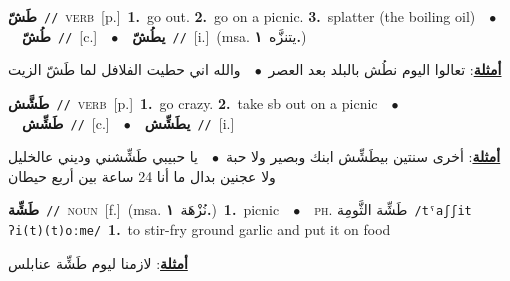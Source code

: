 \documentclass[10pt,a4paper,twoside]{article} %
\begin{document}
\begin{multicols}{2}
{\setlength\topsep{0pt}\textbf{\foreignlanguage{arabic}{طَشّ}}\ {\color{gray}\texttt{//}\color{black}}\ \textsc{verb}\ [p.]\ \textbf{1.}~go out.  \textbf{2.}~go on a picnic.  \textbf{3.}~splatter (the boiling oil)\ \ $\bullet$\ \ \setlength\topsep{0pt}\textbf{\foreignlanguage{arabic}{طُشّ}}\ {\color{gray}\texttt{//}\color{black}}\ [c.]\ \ $\bullet$\ \ \setlength\topsep{0pt}\textbf{\foreignlanguage{arabic}{يطُشّ}}\ {\color{gray}\texttt{//}\color{black}}\ [i.]\ \color{gray}(msa. \foreignlanguage{arabic}{يتنزَّه}~\foreignlanguage{arabic}{\textbf{١.}})\color{black}\  \begin{flushright}\color{gray}\foreignlanguage{arabic}{\textbf{\underline{\foreignlanguage{arabic}{أمثلة}}}: تعالوا اليوم نطُش بالبلد بعد العصر\ $\bullet$\ \  والله اني حطيت الفلافل لما طَشّ الزيت}\end{flushright}\color{black}} \vspace{2mm}

{\setlength\topsep{0pt}\textbf{\foreignlanguage{arabic}{طَشَّش}}\ {\color{gray}\texttt{//}\color{black}}\ \textsc{verb}\ [p.]\ \textbf{1.}~go crazy.  \textbf{2.}~take sb out on a picnic\ \ $\bullet$\ \ \setlength\topsep{0pt}\textbf{\foreignlanguage{arabic}{طَشِّش}}\ {\color{gray}\texttt{//}\color{black}}\ [c.]\ \ $\bullet$\ \ \setlength\topsep{0pt}\textbf{\foreignlanguage{arabic}{يطَشِّش}}\ {\color{gray}\texttt{//}\color{black}}\ [i.]\  \begin{flushright}\color{gray}\foreignlanguage{arabic}{\textbf{\underline{\foreignlanguage{arabic}{أمثلة}}}: أخرى سنتين بيطَشِّش ابنك وبصير ولا حبة\ $\bullet$\ \  يا حبيبي طَشِّشني وديني عالخليل ولا عجنين بدال ما أنا 24 ساعة بين أربع حيطان}\end{flushright}\color{black}} \vspace{2mm}

{\setlength\topsep{0pt}\textbf{\foreignlanguage{arabic}{طَشِّة}}\ {\color{gray}\texttt{//}\color{black}}\ \textsc{noun}\ [f.]\ \color{gray}(msa. \foreignlanguage{arabic}{نُزْهَة}~\foreignlanguage{arabic}{\textbf{١.}})\color{black}\ \textbf{1.}~picnic\ \ $\bullet$\ \ \textsc{ph.} \color{gray} \foreignlanguage{arabic}{طَشِّة الثَّومِة}\color{black}\ {\color{gray}\texttt{/{\sffamily tˤaʃʃit ʔi(t)(t)oːme}/}\color{black}}\ \textbf{1.}~to stir-fry ground garlic and put it on food\  \begin{flushright}\color{gray}\foreignlanguage{arabic}{\textbf{\underline{\foreignlanguage{arabic}{أمثلة}}}: لازمنا ليوم طَشِّة عنابلس}\end{flushright}\color{black}} \vspace{2mm}


\end{multicols}
\end{document}
